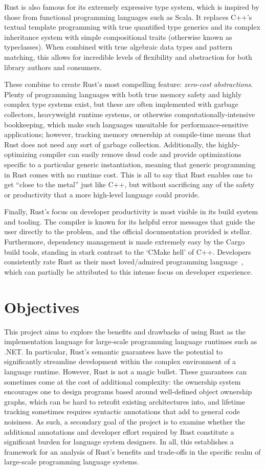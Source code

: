 Rust is also famous for its extremely expressive type system, which is inspired by those from functional programming languages such as Scala.
It replaces C++'s textual template programming with true quantified type generics and its complex inheritance system with simple
compositional traits (otherwise known as typeclasses).
When combined with true algebraic data types and pattern matching, this allows for incredible levels of flexibility and abstraction
for both library authors and consumers.

These combine to create Rust's most compelling feature: \textit{zero-cost abstractions}.
Plenty of programming languages with both true memory safety and highly complex type systems exist, but these are often implemented with
garbage collectors, heavyweight runtime systems, or otherwise computationally-intensive bookkeeping, which make such languages unsuitable
for performance-sensitive applications; however, tracking memory ownership at compile-time means that Rust does not need any sort of garbage collection.
Additionally, the highly-optimizing compiler can easily remove dead code and provide optimizations specific to a particular generic instantiation,
meaning that generic programming in Rust comes with no runtime cost.
This is all to say that Rust enables one to get ``close to the metal'' just like C++,
but without sacrificing any of the safety or productivity that a more high-level language could provide.

Finally, Rust's focus on developer productivity is most visible in its build system and tooling.
The compiler is known for its helpful error messages that guide the user directly to the problem, and the official documentation provided is stellar.
Furthermore, dependency management is made extremely easy by the Cargo build tools,
standing in stark contrast to the `CMake hell' of C++.
Developers consistently rate Rust as their most loved/admired programming language~\cite{sosurvey},
which can partially be attributed to this intense focus on developer experience.

\section{Objectives}
This project aims to explore the benefits and drawbacks of using Rust as the implementation language for large-scale
programming language runtimes such as .NET.
In particular, Rust's semantic guarantees have the potential to significantly streamline development within the
complex environment of a language runtime.
However, Rust is not a magic bullet.
These guarantees can sometimes come at the cost of additional complexity: the ownership system encourages one to design programs
based around well-defined object ownership graphs, which can be hard to retrofit existing architectures into, and lifetime tracking
sometimes requires syntactic annotations that add to general code noisiness.
As such, a secondary goal of the project is to examine whether the additional annotations and developer effort
required by Rust constitute a significant burden for language system designers.
In all, this establishes a framework for an analysis of Rust's benefits and trade-offs in the specific realm of large-scale programming language systems.
